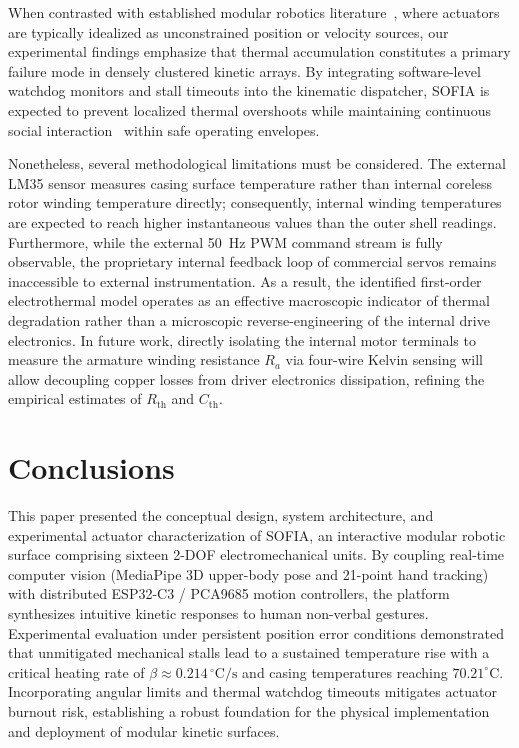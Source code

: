 \documentclass[lettersize,journal]{IEEEtran}
\begin{document}
	When contrasted with established modular robotics literature~\cite{seo2019modular}, where actuators are typically idealized as unconstrained position or velocity sources, our experimental findings emphasize that thermal accumulation constitutes a primary failure mode in densely clustered kinetic arrays. By integrating software-level watchdog monitors and stall timeouts into the kinematic dispatcher, SOFIA is expected to prevent localized thermal overshoots while maintaining continuous social interaction~\cite{fong2003social} within safe operating envelopes.
	
	Nonetheless, several methodological limitations must be considered. The external LM35 sensor measures casing surface temperature rather than internal coreless rotor winding temperature directly; consequently, internal winding temperatures are expected to reach higher instantaneous values than the outer shell readings. Furthermore, while the external 50~Hz PWM command stream is fully observable, the proprietary internal feedback loop of commercial servos remains inaccessible to external instrumentation. As a result, the identified first-order electrothermal model operates as an effective macroscopic indicator of thermal degradation rather than a microscopic reverse-engineering of the internal drive electronics. In future work, directly isolating the internal motor terminals to measure the armature winding resistance $R_a$ via four-wire Kelvin sensing will allow decoupling copper losses from driver electronics dissipation, refining the empirical estimates of $R_{\text{th}}$ and $C_{\text{th}}$.
	
	\newpage
	
	\section{Conclusions}
	\label{sec:conclusions}
	
	This paper presented the conceptual design, system architecture, and experimental actuator characterization of SOFIA, an interactive modular robotic surface comprising sixteen 2-DOF electromechanical units. By coupling real-time computer vision (MediaPipe 3D upper-body pose and 21-point hand tracking) with distributed ESP32-C3 / PCA9685 motion controllers, the platform synthesizes intuitive kinetic responses to human non-verbal gestures. Experimental evaluation under persistent position error conditions demonstrated that unmitigated mechanical stalls lead to a sustained temperature rise with a critical heating rate of $\beta \approx 0.214\,^\circ\text{C/s}$ and casing temperatures reaching $70.21^\circ\text{C}$. Incorporating angular limits and thermal watchdog timeouts mitigates actuator burnout risk, establishing a robust foundation for the physical implementation and deployment of modular kinetic surfaces.
	
\end{document}
